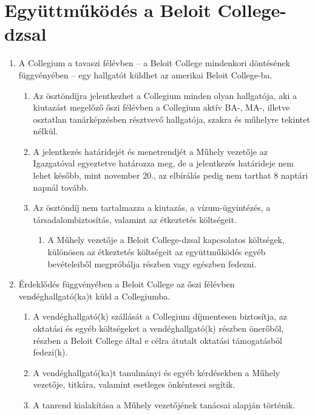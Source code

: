 \documentclass{../styles/rulebook}
\begin{document}
\section{Együttműködés a Beloit College-dzsal}

\begin{enumerate}
	\item A Collegium a tavaszi félévben -- a Beloit College mindenkori döntésének függvényében -- egy hallgatót küldhet az amerikai Beloit College-ba.
	\begin{enumerate}
		\item Az ösztöndíjra jelentkezhet a Collegium minden olyan hallgatója, aki a kiutazást
		megelőző őszi félévben a Collegium aktív BA-, MA-, illetve osztatlan tanárképzésben résztvevő hallgatója,
		szakra és műhelyre tekintet nélkül.
		\item A jelentkezés határidejét és menetrendjét a Műhely vezetője az Igazgatóval egyeztetve határozza meg, de a jelentkezés határideje nem lehet
		később, mint november 20., az elbírálás pedig nem tarthat 8 naptári napnál tovább.
		\item Az ösztöndíj nem tartalmazza a kiutazás, a vízum-ügyintézés, a társadalombiztosítás, valamint az étkeztetés költségeit. 
		\begin{enumerate}
			\item A Műhely vezetője a
			Beloit College-dzsal kapcsolatos költségek, különösen az étkeztetés költségeit az
			együttműködés egyéb bevételeiből megpróbálja részben vagy egészben fedezni.
		\end{enumerate}
	\end{enumerate}
	\item Érdeklődés függvényében a Beloit College az őszi félévben vendéghallgató(ka)t küld
	a Collegiumba. 
	\begin{enumerate}
		\item A vendéghallgató(k) szállását a Collegium díjmentesen biztosítja, az oktatási és egyéb költségeket a vendéghallgató(k) részben önerőből, részben a Beloit
		College által e célra átutalt oktatási támogatásból fedezi(k).
		\item A vendéghallgató(ka)t tanulmányi és egyéb kérdésekben a Műhely vezetője, titkára,
		valamint esetleges önkéntesei segítik. 
		\item A tanrend kialakítása a Műhely vezetőjének
		tanácsai alapján történik.
	\end{enumerate}
\end{enumerate}
\end{document}
